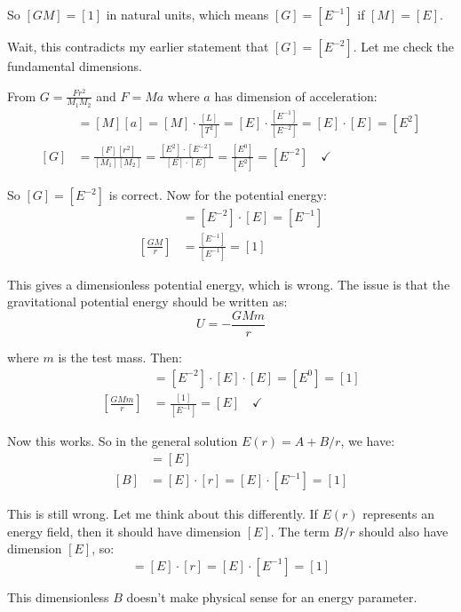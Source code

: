 \documentclass[12pt,a4paper]{report}
\begin{document}
	So $[GM] = [1]$ in natural units, which means $[G] = [E^{-1}]$ if $[M] = [E]$.
	
	Wait, this contradicts my earlier statement that $[G] = [E^{-2}]$. Let me check the fundamental dimensions.
	
	From $G = \frac{F r^2}{M_1 M_2}$ and $F = Ma$ where $a$ has dimension of acceleration:
	\begin{align}
		[F] &= [M][a] = [M] \cdot \frac{[L]}{[T^2]} = [E] \cdot \frac{[E^{-1}]}{[E^{-2}]} = [E] \cdot [E] = [E^2] \\
		[G] &= \frac{[F][r^2]}{[M_1][M_2]} = \frac{[E^2] \cdot [E^{-2}]}{[E] \cdot [E]} = \frac{[E^0]}{[E^2]} = [E^{-2}] \quad \checkmark
	\end{align}
	
	So $[G] = [E^{-2}]$ is correct. Now for the potential energy:
	\begin{align}
		[GM] &= [E^{-2}] \cdot [E] = [E^{-1}] \\
		\left[\frac{GM}{r}\right] &= \frac{[E^{-1}]}{[E^{-1}]} = [1]
	\end{align}
	
	This gives a dimensionless potential energy, which is wrong. The issue is that the gravitational potential energy should be written as:
	\begin{equation}
		U = -\frac{GM m}{r}
	\end{equation}
	
	where $m$ is the test mass. Then:
	\begin{align}
		[GMm] &= [E^{-2}] \cdot [E] \cdot [E] = [E^0] = [1] \\
		\left[\frac{GMm}{r}\right] &= \frac{[1]}{[E^{-1}]} = [E] \quad \checkmark
	\end{align}
	
	Now this works. So in the general solution $E(r) = A + B/r$, we have:
	\begin{align}
		[A] &= [E] \\
		[B] &= [E] \cdot [r] = [E] \cdot [E^{-1}] = [1]
	\end{align}
	
	This is still wrong. Let me think about this differently. If $E(r)$ represents an energy field, then it should have dimension $[E]$. The term $B/r$ should also have dimension $[E]$, so:
	\begin{equation}
		[B] = [E] \cdot [r] = [E] \cdot [E^{-1}] = [1]
	\end{equation}
	
	This dimensionless $B$ doesn't make physical sense for an energy parameter.
	
\end{document}
